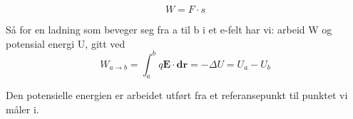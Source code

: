 $$W = F\cdot s$$

Så for en ladning som beveger seg fra a til b i et e-felt har vi:
arbeid W og potensial energi U, gitt ved
$$W_{a\to b}
  = \int_a^b q\mathbf{E}\cdot\mathbf{dr}
  = -\Delta U
  = U_a - U_b$$

Den potensielle energien er arbeidet utført fra et referansepunkt
til punktet vi måler i.
